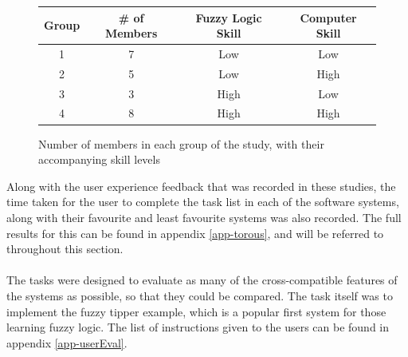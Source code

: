 \begin{figure}[ht!]
\begin{center}
\begin{tabular}{cccc}
\hline
\textbf{Group} 	& \textbf{\# of Members} & \textbf{Fuzzy Logic Skill} & \textbf{Computer Skill} \\
\hline
1				& 7 						 & Low			& Low		\\	
2				& 5  						 & Low			& High		\\
3				& 3 						 & High			& Low 		\\
4				& 8 						 & High 		& High		\\
\hline
\end{tabular}
\end{center}
\captionsetup{justification=centering,margin=2cm}
\vspace{-4mm}
\caption{Number of members in each group of the study, with their accompanying skill levels}
\label{fig:skill-table}
\vspace{-2mm}
\end{figure}
\noindent 
Along with the user experience feedback that was recorded in these studies, the time taken for the user to complete the task list in each of the software systems, along with their favourite and least favourite systems was also recorded. The full results for this can be found in appendix \ref{app-torous}, and will be referred to throughout this section.\ \\
\ \\
The tasks were designed to evaluate as many of the cross-compatible features of the systems as possible, so that they could be compared. The task itself was to implement the fuzzy tipper example, which is a popular first system for those learning fuzzy logic. The list of instructions given to the users can be found in appendix \ref{app-userEval}.

